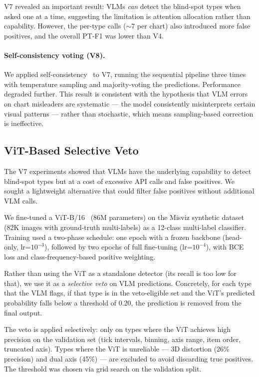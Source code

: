 V7 revealed an important result: VLMs \textit{can} detect the blind-spot types when asked one at a time, suggesting the limitation is attention allocation rather than capability. However, the per-type calls ($\sim$7 per chart) also introduced more false positives, and the overall PT-F1 was lower than V4.

\paragraph{Self-consistency voting (V8).}
We applied self-consistency~\cite{wang2023selfconsistency} to V7, running the sequential pipeline three times with temperature sampling and majority-voting the predictions. Performance degraded further. This result is consistent with the hypothesis that VLM errors on chart misleaders are systematic --- the model consistently misinterprets certain visual patterns --- rather than stochastic, which means sampling-based correction is ineffective.

\subsection{ViT-Based Selective Veto}
\label{sec:vit}

The V7 experiments showed that VLMs have the underlying capability to detect blind-spot types but at a cost of excessive API calls and false positives. We sought a lightweight alternative that could filter false positives without additional VLM calls.

We fine-tuned a ViT-B/16~\cite{dosovitskiy2021vit} (86M parameters) on the Misviz synthetic dataset (82K images with ground-truth multi-labels) as a 12-class multi-label classifier. Training used a two-phase schedule: one epoch with a frozen backbone (head-only, lr=$10^{-3}$), followed by two epochs of full fine-tuning (lr=$10^{-4}$), with BCE loss and class-frequency-based positive weighting.

Rather than using the ViT as a standalone detector (its recall is too low for that), we use it as a \textit{selective veto} on VLM predictions. Concretely, for each type that the VLM flags, if that type is in the veto-eligible set and the ViT's predicted probability falls below a threshold of 0.20, the prediction is removed from the final output.

The veto is applied selectively: only on types where the ViT achieves high precision on the validation set (tick intervals, binning, axis range, item order, truncated axis). Types where the ViT is unreliable --- 3D distortion (26\% precision) and dual axis (45\%) --- are excluded to avoid discarding true positives. The threshold was chosen via grid search on the validation split.

